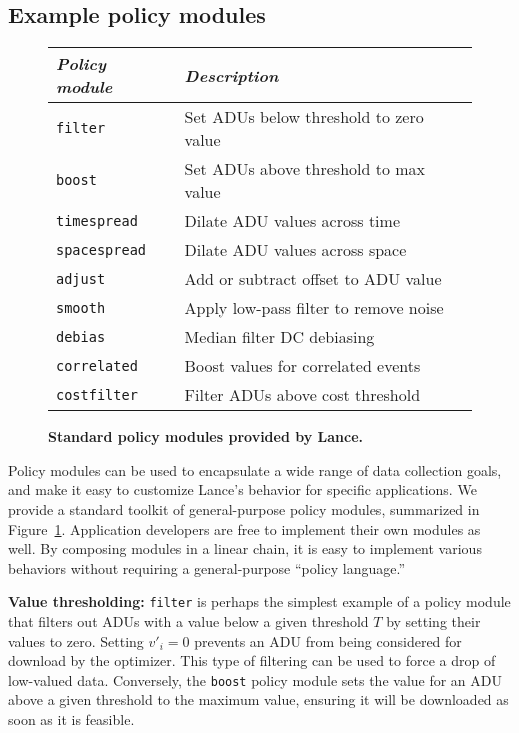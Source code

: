 \subsection{Example policy modules}
\label{lance-sec-example-policies}

\begin{figure}[t]
\label{lance-fig-policymodules}
\begin{center}
\begin{small}
\begin{tabular}{|l|l|} \hline
{\em Policy module} & {\em Description} \\ \hline
{\tt filter} & Set ADUs below threshold to zero value \\
{\tt boost} & Set ADUs above threshold to max value \\
{\tt timespread} & Dilate ADU values across time \\
{\tt spacespread} & Dilate ADU values across space \\
{\tt adjust} & Add or subtract offset to ADU value \\
{\tt smooth} & Apply low-pass filter to remove noise \\
{\tt debias} & Median filter DC debiasing \\
{\tt correlated} & Boost values for correlated events \\
{\tt costfilter} & Filter ADUs above cost threshold \\ \hline
\end{tabular}
\end{small}
\end{center}
\caption{\textbf{Standard policy modules provided by Lance.}}
\end{figure}

Policy modules can be used to encapsulate a wide range of data collection
goals, and make it easy to customize Lance's behavior for specific
applications. We provide a standard toolkit of general-purpose policy
modules, summarized in Figure~\ref{lance-fig-policymodules}.  Application
developers are free to implement their own modules as well.  By composing
modules in a linear chain, it is easy to implement various behaviors without
requiring a general-purpose ``policy language.'' 

{\bf Value thresholding:}
{\tt filter} is perhaps the simplest example of a policy module that 
filters out ADUs with a value below a given threshold $T$ by
setting their values to zero.
Setting $v'_i = 0$ prevents an ADU from being considered for download by the
optimizer.  This type of filtering can be used to force a drop of low-valued
data. Conversely, the {\tt boost} policy module sets the value for an ADU
above a given threshold to the maximum value, ensuring it will be downloaded
as soon as it is feasible.

